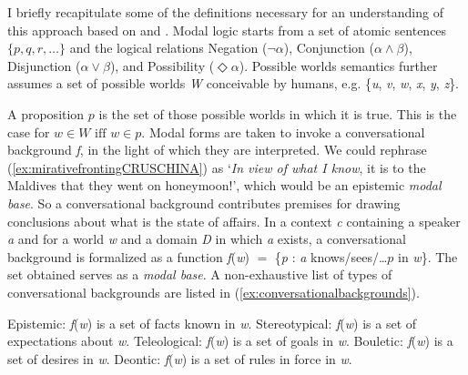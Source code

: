 I briefly recapitulate some of the definitions necessary for an understanding of this approach based on \citet[30--43]{Kratzer.2012} and \citet[50--85]{Portner.2009}. Modal logic starts from a set of atomic sentences $\{p, q, r, \ldots\}$ and the logical relations Negation ($\neg \alpha$), Conjunction ($\alpha \wedge \beta$), Disjunction ($\alpha \vee \beta$), and Possibility ($\Diamond\alpha$). Possible worlds semantics further assumes a set of possible worlds \textit{W} conceivable by humans, e.g. \{\textit{u}, \textit{v}, \textit{w}, \textit{x}, \textit{y}, \textit{z}\}.%

A proposition $p$ is the set of those possible worlds in which it is true. This is the case for $w \in W \text{ iff } w \in p$. Modal forms are taken to invoke a conversational background \textit{f}, in the light of which they are interpreted. We could rephrase (\ref{ex:mirativefrontingCRUSCHINA}) as `\textit{In view of what I know}, it is to the Maldives that they went on honeymoon!', which would be an epistemic \textit{modal base}. So a conversational background contributes premises for drawing conclusions about what is the state of affairs. In a context \textit{c} containing a speaker \textit{a} and for a world \textit{w} and a domain \textit{D} in which \textit{a} exists, a conversational background is formalized as a function \textit{f}(\textit{w}) $=$ \{\textit{p} : \textit{a} knows/sees/\ldots $p$ in \textit{w}\}. The set obtained serves as a \textit{modal base}. A non-exhaustive list of types of conversational backgrounds are listed in (\ref{ex:conversationalbackgrounds}).
	
\begin{exe}
\ex\label{ex:conversationalbackgrounds}
\begin{xlist}
	\ex Epistemic: \textit{f}(\textit{w}) is a set of facts known in \textit{w}.
	\ex Stereotypical: \textit{f}(\textit{w}) is a set of expectations about \textit{w}.
	\ex Teleological: \textit{f}(\textit{w}) is a set of goals in \textit{w}.
	\ex Bouletic: \textit{f}(\textit{w}) is a set of desires in \textit{w}.
	\ex Deontic: \textit{f}(\textit{w}) is a set of rules in force in \textit{w}.
\end{xlist}
\end{exe}

